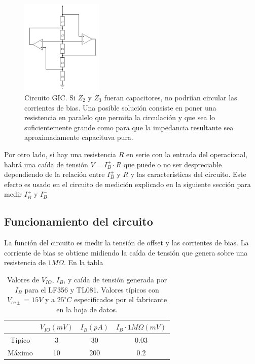 \documentclass[../../main.tex]{subfiles}
\begin{document}
\begin{figure}[htb] %
	\centering
	\includegraphics[width=0.35\textwidth]{imagenes/gic.png}
	\caption[Capacitores en un GIC]{Circuito GIC. Si $Z_2$ y $Z_3$ fueran capacitores, no podri\'ian circular las corrientes de bias. Una posible soluci\'on consiste en poner una resistencia en paralelo que permita la circulaci\'on y que sea lo suficientemente grande como para que la impedancia resultante sea aproximadamente capacituva pura.}
	\label{fig:ej_3_GIC}
\end{figure}


Por otro lado, si hay una resistencia $R$ en serie con la entrada del operacional, habr\'a una ca\'ida de tensi\'on $V=I_B^\pm\cdot R$ que puede o no ser despreciable dependiendo de la relaci\'on entre $I_B^\pm$ y $R$ y las caracter\'isticas del circuito. Este efecto es usado en el circuito de medici\'on explicado en la siguiente secci\'on para medir $I_B^+$ y $I_B^-$

\subsection{Funcionamiento del circuito}
La funci\'on del circuito es medir la tensi\'on de offset y las corrientes de bias. La corriente de bias se obtiene midiendo la ca\'ida de tensi\'on que genera sobre una resistencia de $1M\Omega$. En la tabla 


\begin{table}[htb]
	\centering
	\begin{tabular}{cccc}
	         & $V_{IO}(mV)$ & $I_B (pA) $ & $I_B\cdot 1M\Omega (mV)$    \\
\hline
	T\'ipico &     3        &      30     &  0.03       \\
	M\'aximo &	  10        &     200   &  0.2		
	\end{tabular}
	\caption{Valores de $V_{IO}$, $I_B$, y ca\'ida de tensi\'on generada por $I_B$ para el LF356 y TL081. Valores t\'ipicos con $V_{cc\pm}=15V$ y a $25^{\circ}C$ especificados por el fabricante en la hoja de datos.}
	\label{tab:ej_3_datasheet}
\end{table}
\end{document}
